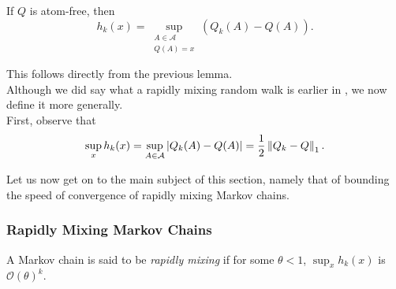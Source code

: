 \begin{lemma}
If $Q$ is atom-free, then
\[ h_k(x) = \sup_{\substack{A\in\mathcal{A} \\ Q(A)=x}} \left(Q_k(A) - Q(A)\right). \]
\end{lemma}
This follows directly from the previous lemma.\\
Although we did say what a rapidly mixing random walk is earlier in , we now define it more generally.\\
First, observe that
\[ \sup_{x} h_k(x) = \sup_{A\in\mathcal{A}} |Q_k(A) - Q(A)| = \frac{1}{2}\left\lVert Q_k - Q\right\rVert_1. \]

Let us now get on to the main subject of this section, namely that of bounding the speed of convergence of rapidly mixing Markov chains.

\subsubsection{Rapidly Mixing Markov Chains}

\begin{fdef}
A Markov chain is said to be \textit{rapidly mixing} if for some $\theta<1$, $\sup_x h_k(x)$ is $\mathcal{O}(\theta)^k$.
\end{fdef}


